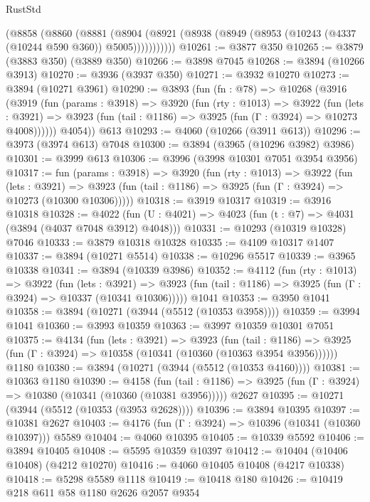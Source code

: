 \begin{lexlean}{RustStd}
\begin{coremodule}
        (@8858
          (@8860
            (@8881
              (@8904 (@8921 (@8938 (@8949 (@8953 (@10243 (@4337 (@10244 @590 @360)) @5005)))))))))))
@10261 := @3877 @350
@10265 := @3879 (@3883 @350) (@3889 @350)
@10266 := @3898 @7045
@10268 := @3894 (@10266 @3913)
@10270 := @3936 (@3937 @350)
@10271 := @3932 @10270
@10273 := @3894 (@10271 @3961)
@10290 := @3893
    (fun (fn : @78) =>
    @10268
      (@3916
        (@3919
          (fun (params : @3918) =>
          @3920
            (fun (rty : @1013) =>
            @3922
              (fun (lets : @3921) =>
              @3923 (fun (tail : @1186) => @3925 (fun (Γ : @3924) => @10273 @4008))))))
        @4054))
    @613
@10293 := @4060 (@10266 (@3911 @613))
@10296 := @3973 (@3974 @613) @7048
@10300 := @3894 (@3965 (@10296 @3982) @3986)
@10301 := @3999 @613
@10306 := @3996 (@3998 @10301 @7051 @3954 @3956)
@10317 := fun (params : @3918) =>
  @3920
    (fun (rty : @1013) =>
    @3922
      (fun (lets : @3921) =>
      @3923 (fun (tail : @1186) => @3925 (fun (Γ : @3924) => @10273 (@10300 @10306)))))
@10318 := @3919 @10317
@10319 := @3916 @10318
@10328 := @4022 (fun (U : @4021) => @4023 (fun (t : @7) => @4031 (@3894 (@4037 @7048 @3912) @4048)))
@10331 := @10293 (@10319 @10328) @7046
@10333 := @3879 @10318 @10328
@10335 := @4109 @10317 @1407
@10337 := @3894 (@10271 @5514)
@10338 := @10296 @5517
@10339 := @3965 @10338
@10341 := @3894 (@10339 @3986)
@10352 := @4112
    (fun (rty : @1013) =>
    @3922
      (fun (lets : @3921) =>
      @3923 (fun (tail : @1186) => @3925 (fun (Γ : @3924) => @10337 (@10341 @10306)))))
    @1041
@10353 := @3950 @1041
@10358 := @3894 (@10271 (@3944 (@5512 (@10353 @3958))))
@10359 := @3994 @1041
@10360 := @3993 @10359
@10363 := @3997 @10359 @10301 @7051
@10375 := @4134
    (fun (lets : @3921) =>
    @3923
      (fun (tail : @1186) =>
      @3925 (fun (Γ : @3924) => @10358 (@10341 (@10360 (@10363 @3954 @3956))))))
    @1180
@10380 := @3894 (@10271 (@3944 (@5512 (@10353 @4160))))
@10381 := @10363 @1180
@10390 := @4158
    (fun (tail : @1186) => @3925 (fun (Γ : @3924) => @10380 (@10341 (@10360 (@10381 @3956)))))
    @2627
@10395 := @10271 (@3944 (@5512 (@10353 (@3953 @2628))))
@10396 := @3894 @10395
@10397 := @10381 @2627
@10403 := @4176 (fun (Γ : @3924) => @10396 (@10341 (@10360 @10397))) @5589
@10404 := @4060 @10395
@10405 := @10339 @5592
@10406 := @3894 @10405
@10408 := @5595 @10359 @10397
@10412 := @10404 (@10406 @10408) (@4212 @10270)
@10416 := @4060 @10405 @10408 (@4217 @10338)
@10418 := @5298 @5589 @1118
@10419 := @10418 @180
@10426 := @10419 @218 @611 @58 @1180 @2626 @2057 @9354

\end{coremodule}
\end{lexlean}
